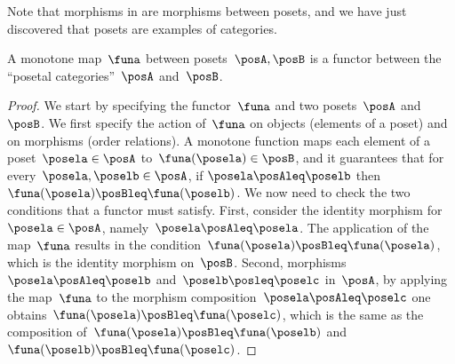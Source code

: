 
Note that morphisms in \Pos are morphisms between posets, and we have just discovered that posets are examples of categories.
\begin{lemma}
    \label{lem:posetfunctor}
    A monotone map~$\funa$ between posets~$\posA,\posB$ is a functor between the ``posetal categories''~$\posA$ and~$\posB$.
\end{lemma}
\begin{proof}
    We start by specifying the functor~$\funa$ and two posets~$\posA$ and~$\posB$. We first specify the action of~$\funa$ on objects (elements of a poset) and on morphisms (order relations). A monotone function maps each element of a poset~$\posela\in \posA$ to~$\funa(\posela) \in \posB$, and it guarantees that for every~$\posela,\poselb\in \posA$, if $\posela\posAleq \poselb$ then~$\funa(\posela)\posBleq \funa(\poselb)$. We now need to check the two conditions that a functor must satisfy. First, consider the identity morphism for~$\posela\in \posA$, namely~$\posela \posAleq \posela$. The application of the map~$\funa$ results in the condition~$\funa(\posela)\posBleq \funa(\posela)$, which is the identity morphism on~$\posB$. Second, morphisms~$\posela\posAleq \poselb$ and~$\poselb\posleq \poselc$ in~$\posA$, by applying the map~$\funa$ to the morphism composition~$\posela\posAleq \poselc$ one obtains~$\funa(\posela)\posBleq \funa(\poselc)$, which is the same as the composition of~$\funa(\posela)\posBleq \funa(\poselb)$ and~$\funa(\poselb)\posBleq \funa(\poselc)$.
\end{proof}

